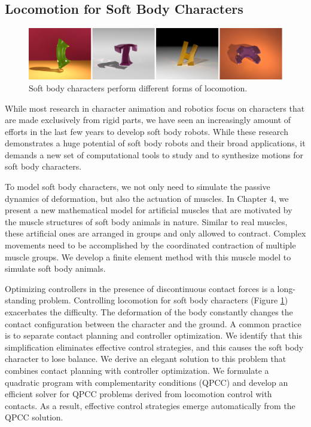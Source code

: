 \subsection{Locomotion for Soft Body Characters}

\begin{figure}[!h]
  \centering
    \includegraphics[width=\textwidth]{figures/teaserSoftBody.eps}
  \caption{Soft body characters perform different forms of locomotion.}
  \label{fig:teaser2}
\end{figure}

While most research in character animation and robotics focus on characters that are made exclusively from rigid parts, we have seen an increasingly amount of efforts in the last few years to develop soft body robots. While these research demonstrates a huge potential of soft body robots and their broad applications, it demands a new set of computational tools to study and to synthesize motions for soft body characters.

To model soft body characters, we not only need to simulate the passive dynamics of deformation, but also the actuation of muscles. In Chapter 4, we present a new mathematical model for artificial muscles \cite{Tan:2012} that are motivated by the muscle structures of soft body animals in nature. Similar to real muscles, these artificial ones are arranged in groups and only allowed to contract. Complex movements need to be accomplished by the coordinated contraction of multiple muscle groups. We develop a finite element method with this muscle model to simulate soft body animals.

Optimizing controllers in the presence of discontinuous contact forces is a long-standing problem. Controlling locomotion for soft body characters (Figure \ref{fig:teaser2}) exacerbates the difficulty. The deformation of the body constantly changes the contact configuration between the character and the ground. A common practice is to separate contact planning and controller optimization. We identify that this simplification eliminates effective control strategies, and this causes the soft body character to lose balance. We derive an elegant solution to this problem that combines contact planning with controller optimization. We formulate a quadratic program with complementarity conditions (QPCC) and develop an efficient solver for QPCC problems derived from locomotion control with contacts. As a result, effective control strategies emerge automatically from the QPCC solution.

